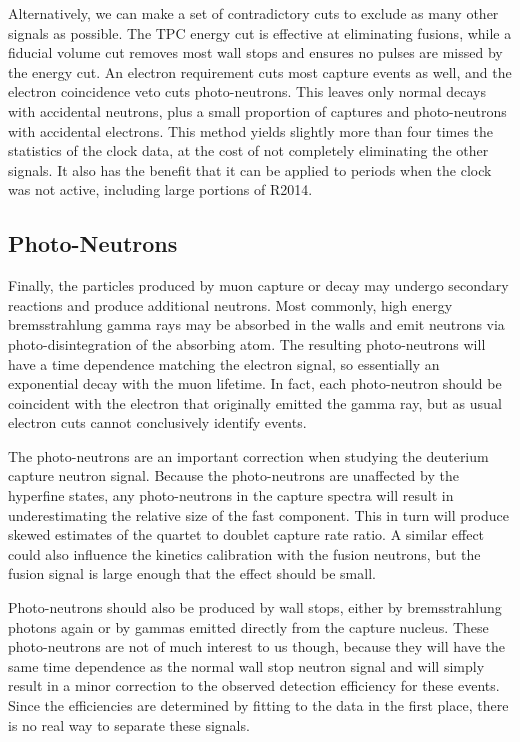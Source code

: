 Alternatively, we can make a set of contradictory cuts to exclude as many other signals as possible.  
The TPC energy cut is effective at eliminating fusions, while a fiducial volume cut removes most wall stops and ensures no pulses are missed by the energy cut.
An electron requirement cuts most capture events as well, and the electron coincidence veto cuts photo-neutrons.
This leaves only normal decays with accidental neutrons, plus a small proportion of captures and photo-neutrons with accidental electrons.  
This method yields slightly more than four times the statistics of the clock data, at the cost of not completely eliminating the other signals.
It also has the benefit that it can be applied to periods when the clock was not active, including large portions of R2014.

\subsection{Photo-Neutrons}

Finally, the particles produced by muon capture or decay may undergo secondary reactions and produce additional neutrons.
Most commonly, high energy bremsstrahlung gamma rays may be absorbed in the walls and emit neutrons via photo-disintegration of the absorbing atom.
The resulting photo-neutrons will have a time dependence matching the electron signal, so essentially an exponential decay with the muon lifetime.
In fact, each photo-neutron should be coincident with the electron that originally emitted the gamma ray, but as usual electron cuts cannot conclusively identify events. 

The photo-neutrons are an important correction when studying the deuterium capture neutron signal.
Because the photo-neutrons are unaffected by the hyperfine states, any photo-neutrons in the capture spectra will result in underestimating the relative size of the fast component.
This in turn will produce skewed estimates of the quartet to doublet capture rate ratio.
A similar effect could also influence the kinetics calibration with the fusion neutrons, but the fusion signal is large enough that the effect should be small.

Photo-neutrons should also be produced by wall stops, either by bremsstrahlung photons again or by gammas emitted directly from the capture nucleus.
These photo-neutrons are not of much interest to us though, because they will have the same time dependence as the normal wall stop neutron signal and will simply result in a minor correction to the observed detection efficiency for these events.
Since the efficiencies are determined by fitting to the data in the first place, there is no real way to separate these signals.

